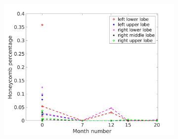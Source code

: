 \begin{figure}[htbp]
\begin{subfigure}{.46\linewidth}
  \includegraphics[width=\linewidth,trim={{.0\wd0} {.0\wd0} {.0\wd0} {.0\wd0}},clip]{QuantitativeAnalysis/Image/HoneycombLobarRegionDiseaseDistributionAverage.jpg} %
  \caption{}
  \label{fig:LobarRegionDiseaseDistributionAverage-c} 
\end{subfigure} 
\hspace{.3in}
\begin{subfigure}{.46\linewidth}%

\end{subfigure}
\end{figure}
